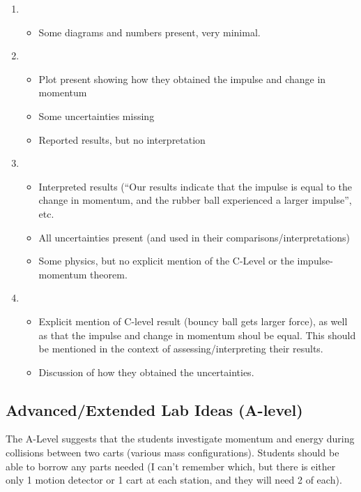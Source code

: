 \documentclass[fleqn,letterpaper]{article}
\begin{document}
\begin{enumerate}
 \item{
  \begin{itemize}
   \item{Some diagrams and numbers present, very minimal.}
  \end{itemize}
}
 \item{
  \begin{itemize}
   \item{Plot present showing how they obtained the impulse and change in momentum}
   \item{Some uncertainties missing}
   \item{Reported results, but no interpretation}
  \end{itemize}
}
 \item{
  \begin{itemize}
   \item{Interpreted results (``Our results indicate that the impulse is equal to the change in momentum, and the rubber ball experienced a larger impulse'', etc.}
   \item{All uncertainties present (and used in their comparisons/interpretations)}
   \item{Some physics, but no explicit mention of the C-Level or the impulse-momentum theorem.}
  \end{itemize}
}
 \item{
  \begin{itemize}
   \item{Explicit mention of C-level result (bouncy ball gets larger force), as well as that the impulse and change in momentum shoul be equal.  This should be mentioned in the context of assessing/interpreting their results.}
   \item{Discussion of how they obtained the uncertainties.}
  \end{itemize}
}
\end{enumerate}


\subsection*{Advanced/Extended Lab Ideas (A-level)}

The A-Level suggests that the students investigate momentum and energy during collisions between two carts (various mass configurations).  Students should be able to borrow any parts needed (I can't remember which, but there is either only 1 motion detector or 1 cart at each station, and they will need 2 of each).
\end{document}
